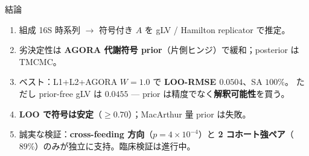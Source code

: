\documentclass[
  ignorenonframetext,
  aspectratio=169,
]{beamer}
\providecommand{\tightlist}{%
  \setlength{\itemsep}{0pt}\setlength{\parskip}{0pt}}
\begin{document}
\begin{frame}{結論}
\protect\hypertarget{ux7d50ux8ad6}{}
\begin{enumerate}
\tightlist
\item
  組成 16S 時系列 \(\to\) 符号付き \(A\) を gLV / Hamilton replicator
  で推定。
\item
  劣決定性は \textbf{AGORA 代謝符号
  prior}（片側ヒンジ）で緩和；posterior は TMCMC。
\item
  ベスト：L1+L2+AGORA \(W=1.0\) で \textbf{LOO-RMSE \(0.0504\)}、SA
  \(100\%\)。 ただし prior-free gLV は \(0.0455\) --- prior
  は精度でなく\textbf{解釈可能性}を買う。
\item
  \textbf{LOO で符号は安定}（\(\geq0.70\)）；MacArthur 量 prior は失敗。
\item
  誠実な検証：\textbf{cross-feeding 方向}（\(p=4\times10^{-4}\)）と
  \textbf{2
  コホート強ペア}（\(89\%\)）のみが独立に支持。臨床検証は進行中。
\end{enumerate}
\end{frame}
\end{document}
